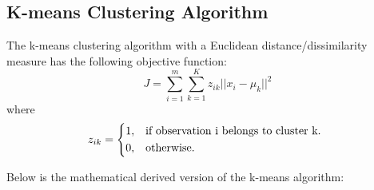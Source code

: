 \documentclass[]{article}
\begin{document}
\subsection{K-means Clustering Algorithm}
The k-means clustering algorithm with a Euclidean distance/dissimilarity measure has the following objective function:
	\begin{equation}
		J = \sum_{i=1}^{m} \sum_{k=1}^{K} z_{ik} || x_i - \mu_k ||^2
	\end{equation}
where
\[ 
  z_{ik} = 
  \begin{dcases*} 
  1, & if observation i belongs to cluster k.  \\ 
  0, & otherwise. 
  \end{dcases*} 
\]

\noindent Below is the mathematical derived version of the k-means algorithm: 
 
\end{document}
